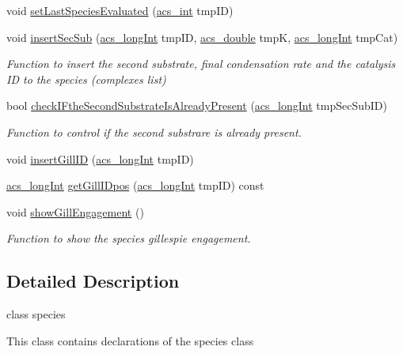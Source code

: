 \begin{DoxyCompactItemize}
void \hyperlink{a00022_a8daa007da55f042b9c436f956836f4d8}{set\-Last\-Species\-Evaluated} (\hyperlink{a00024_a8d277355641a098190360234e2ebde35}{acs\-\_\-int} tmp\-I\-D)
\item 
void \hyperlink{a00022_a0da8d53a216583f7790b12362da376a3}{insert\-Sec\-Sub} (\hyperlink{a00024_a19319d75f02db4308bc5c0026d98cd85}{acs\-\_\-long\-Int} tmp\-I\-D, \hyperlink{a00024_ab776853a005fcbf56af0424a2a4dd607}{acs\-\_\-double} tmp\-K, \hyperlink{a00024_a19319d75f02db4308bc5c0026d98cd85}{acs\-\_\-long\-Int} tmp\-Cat)
\begin{DoxyCompactList}\small\item\em Function to insert the second substrate, final condensation rate and the catalysis I\-D to the species (complexes list) \end{DoxyCompactList}\item 
bool \hyperlink{a00022_af04a95fb2b35bf988271a60413ec508e}{check\-I\-Fthe\-Second\-Substrate\-Is\-Already\-Present} (\hyperlink{a00024_a19319d75f02db4308bc5c0026d98cd85}{acs\-\_\-long\-Int} tmp\-Sec\-Sub\-I\-D)
\begin{DoxyCompactList}\small\item\em Function to control if the second substrare is already present. \end{DoxyCompactList}\item 
void \hyperlink{a00022_aeca516fc712a2bfa19ec560961ed03f7}{insert\-Gill\-I\-D} (\hyperlink{a00024_a19319d75f02db4308bc5c0026d98cd85}{acs\-\_\-long\-Int} tmp\-I\-D)
\item 
\hyperlink{a00024_a19319d75f02db4308bc5c0026d98cd85}{acs\-\_\-long\-Int} \hyperlink{a00022_a1a5c93a3fd5a2605d5e2fd14d29b97cd}{get\-Gill\-I\-Dpos} (\hyperlink{a00024_a19319d75f02db4308bc5c0026d98cd85}{acs\-\_\-long\-Int} tmp\-I\-D) const 
\item 
void \hyperlink{a00022_a211914e1702d47eb3203730fec2c7b4c}{show\-Gill\-Engagement} ()
\begin{DoxyCompactList}\small\item\em Function to show the species gillespie engagement. \end{DoxyCompactList}\end{DoxyCompactItemize}


\subsection{Detailed Description}
class species 

This class contains declarations of the species class

